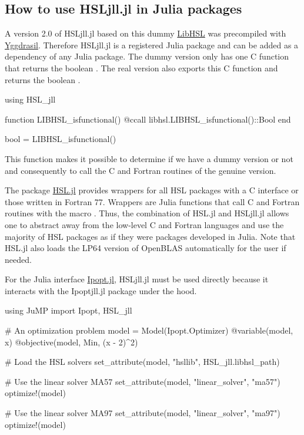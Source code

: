 \documentclass[gdweb]{geradwp}
\renewcommand{\_}{\raisebox{+0.35mm}{\textunderscore}}
\newcommand{\LibHSL}{LibHSL\xspace}
\newcommand{\HSLjll}{HSL\_jll.jl\xspace}
\newcommand{\Ipoptjll}{Ipopt\_jll.jl\xspace}
\begin{document}
\subsection{How to use \HSLjll in Julia packages}

A version 2.0 of \HSLjll based on this dummy \href{https://github.com/ralna/LibHSL}{\LibHSL} was precompiled with \href{https://github.com/JuliaPackaging/Yggdrasil}{Yggdrasil}.
Therefore \HSLjll is a registered Julia package and can be added as a dependency of any Julia package.
The dummy version only has one C function \jlinl{LIBHSL\_isfunctional} that returns the boolean .
The real version also exports this C function and returns the boolean .
\begin{jllisting}
using HSL_jll

function LIBHSL_isfunctional()
    @ccall libhsl.LIBHSL_isfunctional()::Bool
end

bool = LIBHSL_isfunctional()
\end{jllisting}
This function makes it possible to determine if we have a dummy version or not and consequently to call the C and Fortran routines of the genuine version.

The package \href{https://github.com/JuliaSmoothOptimizers/HSL.jl}{HSL.jl} provides wrappers for all HSL packages with a C interface or those written in Fortran 77.
Wrappers are Julia functions that call C and Fortran routines with the macro .
Thus, the combination of HSL.jl and \HSLjll allows one to abstract away from the low-level C and Fortran languages and use the majority of HSL packages as if they were packages developed in Julia.
Note that HSL.jl also loads the LP64 version of OpenBLAS automatically for the user if needed.

For the Julia interface \href{https://github.com/jump-dev/Ipopt.jl}{Ipopt.jl}, \HSLjll must be used directly because it interacts with the \Ipoptjll package under the hood.

\begin{jllisting}
using JuMP
import Ipopt, HSL_jll

# An optimization problem
model = Model(Ipopt.Optimizer)
@variable(model, x)
@objective(model, Min, (x - 2)^2)

# Load the HSL solvers
set_attribute(model, "hsllib", HSL_jll.libhsl_path)

# Use the linear solver MA57
set_attribute(model, "linear_solver", "ma57")
optimize!(model)

# Use the linear solver MA97
set_attribute(model, "linear_solver", "ma97")
optimize!(model)
\end{jllisting}
\end{document}

